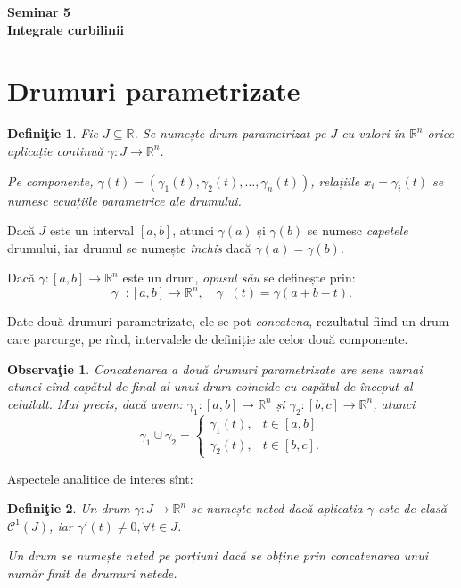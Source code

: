 \documentclass[11pt,a4paper]{article}
\newcommand\kal{\mathcal}
\newcommand\seq{\subseteq}
\newcommand\RR{\mathbb{R}}
\theoremstyle{dotless}
\theoremstyle{dotlessdr}
\newtheorem{definition}{Defini\c{t}ie}[section]
\newtheorem{remark}{Observa\c{t}ie}[section]
\begin{document}
\begin{center}
  {\large\textbf{Seminar 5 \\ Integrale curbilinii}}
\end{center}

\vspace{1cm}

\section{Drumuri parametrizate}
\label{sec:dr-par}

\begin{definition}\label{def:dr-par}
  Fie $J \seq \RR$. Se numește \emph{drum parametrizat} pe $J$ cu valori în $\RR^n$
  orice aplicație continuă $\gamma : J \to \RR^n$.

  Pe componente, $\gamma(t) = (\gamma_1(t), \gamma_2(t), \dots, \gamma_n(t))$,
  relațiile $x_i = \gamma_i(t)$ se numesc \emph{ecuațiile parametrice} ale drumului.
\end{definition}

Dacă $J$ este un interval $[a,b]$, atunci $\gamma(a)$ și $\gamma(b)$ se numesc
\emph{capetele} drumului, iar drumul se numește \emph{închis} dacă $\gamma(a) = \gamma(b)$.

Dacă $\gamma : [a, b] \to \RR^n$ este un drum, \emph{opusul său} se definește prin:
\[
  \gamma^- : [a, b] \to \RR^n, \quad \gamma^-(t) = \gamma(a + b - t).
\]

Date două drumuri parametrizate, ele se pot \emph{concatena}, rezultatul
fiind un drum care parcurge, pe rînd, intervalele de definiție ale celor
două componente.

\begin{remark}\label{rk:dr-concat}
  Concatenarea a două drumuri parametrizate are sens numai atunci cînd capătul
  de final al unui drum coincide cu capătul de început al celuilalt. Mai precis,
  dacă avem: $\gamma_1 : [a, b] \to \RR^n$ și $\gamma_2: [b, c] \to \RR^n$, atunci
  \[
    \gamma_1 \cup \gamma_2 =
    \begin{cases}
      \gamma_1(t), & t \in [a, b] \\
      \gamma_2(t), & t \in [b, c].
    \end{cases}
  \]
\end{remark}

Aspectele analitice de interes sînt:

\begin{definition}\label{def:neted}
  Un drum $\gamma : J \to \RR^n$ se numește \emph{neted} dacă aplicația $\gamma$
  este de clasă $\kal{C}^1(J)$, iar $\gamma'(t) \neq 0, \forall t \in J$.

  Un drum se numește \emph{neted pe porțiuni} dacă se obține prin concatenarea
  unui număr finit de drumuri netede.
\end{definition}
\end{document}
